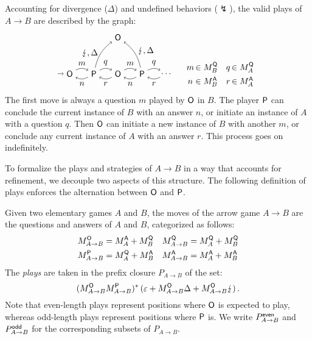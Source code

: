 Accounting for divergence ($\Delta$) and undefined behaviors ($\lightning$),
the valid plays of $A \rightarrow B$
are described by the graph:
\[
  \begin{tikzpicture}[baseline=(O1.base)]
    \node (O1) at (0,0) {\kw{O}};
    \node (P1) at (1,0) {\kw{P}};
    \node (O2) at (2,0) {\kw{O}};
    \node (P2) at (3,0) {\kw{P}};
    \node (O3) at (4,0) {$\ldots$};
    \node (H) at (2,1.5) {\kw{O}};
    \path [->] (-0.5,0) edge (O1);
    \path [->] (O1) edge[bend left] node[auto] {$m$} (P1);
    \path [->] (P1) edge[bend left] node[auto] {$n$} (O1);
    \path [->] (P1) edge[bend left] node[auto] {$q$} (O2);
    \path [->] (P1) edge[bend left=20] node[auto,anchor=east] {$\lightning, \Delta$} (H);
    \path [->] (O2) edge[bend left] node[auto] {$r$} (P1);
    \path [->] (O2) edge[bend left] node[auto] {$m$} (P2);
    \path [->] (P2) edge[bend left] node[auto] {$n$} (O2);
    \path [->] (P2) edge[bend left] node[auto] {$q$} (O3);
    \path [->] (P2) edge[bend right=20] node[anchor=base west] {$\lightning, \Delta$} (H);
    \path [->] (O3) edge[bend left] node[auto] {$r$} (P2);
  \end{tikzpicture}
  \quad
  \begin{array}{c@{\,}lc@{\,}l}
    m &\in M_B^\kw{Q} & q &\in M_A^\kw{Q} \\[1ex]
    n &\in M_B^\kw{A} & r &\in M_A^\kw{A}
  \end{array}
\]
The first move is always a question $m$ played by $ \mathsf{O} $ in $B$.
The player $ \mathsf{P} $ can conclude the current instance of $B$
with an answer $n$, or
initiate an instance of $A$
with a question $q$.
Then $ \mathsf{O} $ can initiate a new instance of $B$
with another $m$, or
conclude any current instance of $A$
with an answer $r$.
This process goes on indefinitely.

To formalize the plays and strategies of $A \rightarrow B$
in a way that accounts for refinement,
we decouple two aspects of this structure.
The following definition of plays
enforces the alternation between $ \mathsf{O} $ and $ \mathsf{P} $.

\begin{definition} %
Given two elementary games $A$ and $B$,
the moves of the arrow game $A \rightarrow B$
are the questions and answers of $A$ and $B$,
categorized as follows:
\begin{align*}
  M_{A \rightarrow B}^{ \mathsf{O} } &= M_A^{ \mathsf{A} } + M_B^{ \mathsf{Q} } &
  M_{A \rightarrow B}^{ \mathsf{Q} } &= M_A^{ \mathsf{Q} } + M_B^{ \mathsf{Q} } \\
  M_{A \rightarrow B}^{ \mathsf{P} } &= M_A^{ \mathsf{Q} } + M_B^{ \mathsf{A} } &
  M_{A \rightarrow B}^{ \mathsf{A} } &= M_A^{ \mathsf{A} } + M_B^{ \mathsf{A} }
\end{align*}
The \emph{plays} are taken in
the prefix closure $P_{A \rightarrow B}$ of the set:
\[
    (M_{A \rightarrow B}^{ \mathsf{O} }
     M_{A \rightarrow B}^{ \mathsf{P} })^* \,
    (\varepsilon +
     M_{A \rightarrow B}^{ \mathsf{O} } \Delta +
     M_{A \rightarrow B}^{ \mathsf{O} } \lightning) \,.
\]
Note that
even-length plays represent positions where $ \mathsf{O} $ is expected to play,
whereas odd-length plays represent positions where $ \mathsf{P} $ is.
We write $P_{A \rightarrow B}^{ \mathsf{even} }$ and $P_{A \rightarrow B}^{ \mathsf{odd} }$
for the corresponding subsets of $P_{A \rightarrow B}$.
\end{definition}


